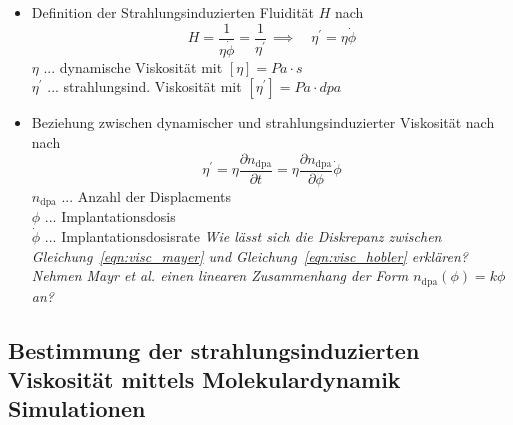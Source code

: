 \documentclass[a4paper, 10pt, 
               numbers=noenddot, toc=graduated,
               headsepline=true, footsepline=true,
               twoside=false, titlepage=true, 
               bibliography=totoc]{scrartcl}
\newcommand{\refeqn}[1]  {Gleichung~\ref{#1}}
\begin{document}
\begin{itemize}
\begin{itemize}
					     
		\end{itemize}
	
	\item Definition der Strahlungsinduzierten Fluidität $H$ nach \cite{Mayr2003}
	      \begin{equation}\label{eqn:visc_mayer}
		    H = \frac 1 {\eta \dot{\phi}} = \frac 1 {\eta^{'}}\, \implies \quad \eta^{'} = \eta \dot{\phi}
	      \end{equation}  
		$\eta$ ... dynamische Viskosität mit $\left[\eta\right] = Pa \cdot s$\\
		$\eta^{'}$ ... strahlungsind. Viskosität mit $\left[\eta^{'}\right] = Pa \cdot dpa$
		
	\item Beziehung zwischen dynamischer und strahlungsinduzierter Viskosität nach nach \cite{hobler2017hpm}
	      \begin{equation}\label{eqn:visc_hobler}
		    \eta^{'} = \eta \frac{\partial n_\mathrm{dpa}}{\partial t} = \eta \frac{\partial n_\mathrm{dpa}}{\partial \phi} \dot{\phi}
	      \end{equation} 
		$ n_\mathrm{dpa}$ ... Anzahl der Displacments \\
		$\phi$ ... Implantationsdosis\\
		$\dot{\phi}$ ... Implantationsdosisrate\newline
		\textit{Wie lässt sich die Diskrepanz zwischen \refeqn{eqn:visc_mayer} und \refeqn{eqn:visc_hobler} erklären? Nehmen Mayr et al. einen linearen Zusammenhang der Form $n_\mathrm{dpa}(\phi) = k \phi$ an?}
		
		
	
\end{itemize}


\subsection{Bestimmung der strahlungsinduzierten Viskosität mittels Molekulardynamik Simulationen}
\end{document}
